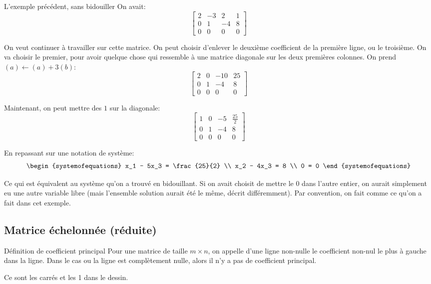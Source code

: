 \documentclass{article}
\begin{document}
\begin{parag}{L'exemple précédent, sans bidouiller}
    On avait:
   \[\begin{bmatrix} 2 & -3 & 2 & 1 \\ 0 & 1 & -4 & 8 \\ 0 & 0 & 0 & 0 \end{bmatrix} \]

   On veut continuer à travailler sur cette matrice. On peut choisir d'enlever le deuxième coefficient de la première ligne, ou le troisième. On va choisir le premier, pour avoir quelque chose qui ressemble à une matrice diagonale sur les deux premières colonnes. On prend $\left(a\right) \leftarrow \left(a\right) + 3\left(b\right)$:
   \[\begin{bmatrix} 2 & 0 & -10 & 25 \\ 0 & 1 & -4 & 8 \\ 0 & 0 & 0 & 0 \end{bmatrix} \]

   Maintenant, on peut mettre des $1$ sur la diagonale:
   \[\begin{bmatrix} 1 & 0 & -5 & \frac{25}{2} \\ 0 & 1 & -4 & 8 \\ 0 & 0 & 0 & 0 \end{bmatrix} \]

   En repassant sur une notation de système:
   \[\begin{systemofequations}
   x_1 - 5x_3 = \frac{25}{2} \\
   x_2 - 4x_3 = 8  \\
   0 = 0
   \end{systemofequations}\]

   Ce qui est équivalent au système qu'on a trouvé en bidouillant. Si on avait choisit de mettre le 0 dans l'autre entier, on aurait simplement eu une autre variable libre (mais l'ensemble solution aurait été le même, décrit différemment). Par convention, on fait comme ce qu'on a fait dans cet exemple.
\end{parag}

\subsection{Matrice échelonnée (réduite)}


\begin{parag}{Définition de coefficient principal}
    Pour une matrice de taille $m \times n$, on appelle  d'une ligne non-nulle le coefficient non-nul le plus à gauche dans la ligne. Dans le cas ou la ligne est complètement nulle, alors il n'y a pas de coefficient principal.

    Ce sont les carrés et les 1 dans le dessin.
\end{parag}
\end{document}
